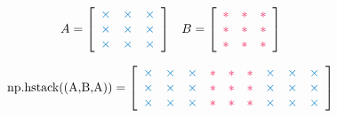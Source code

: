 \begin{align*}
A = \left[\begin{array}{ccc}
\textcolor{blue}{\times}&\textcolor{blue}{\times}&\textcolor{blue}{\times}\\
\textcolor{blue}{\times}&\textcolor{blue}{\times}&\textcolor{blue}{\times}\\
\textcolor{blue}{\times}&\textcolor{blue}{\times}&\textcolor{blue}{\times}
\end{array}\right]
&&
B = \left[\begin{array}{ccc}
\textcolor{red}{*} & \textcolor{red}{*} & \textcolor{red}{*} \\
\textcolor{red}{*} & \textcolor{red}{*} & \textcolor{red}{*} \\
\textcolor{red}{*} & \textcolor{red}{*} & \textcolor{red}{*}
\end{array}\right]
\end{align*}

\begin{align*}
\text{\li{np.hstack((A,B,A))}} =
\left[\begin{array}{ccccccccc}
\textcolor{blue}{\times}&\textcolor{blue}{\times}&\textcolor{blue}{\times}&
\textcolor{red}{*} & \textcolor{red}{*} & \textcolor{red}{*}&
\textcolor{blue}{\times}&\textcolor{blue}{\times}&\textcolor{blue}{\times}\\
\textcolor{blue}{\times}&\textcolor{blue}{\times}&\textcolor{blue}{\times}&
\textcolor{red}{*} & \textcolor{red}{*} & \textcolor{red}{*}&
\textcolor{blue}{\times}&\textcolor{blue}{\times}&\textcolor{blue}{\times}\\
\textcolor{blue}{\times}&\textcolor{blue}{\times}&\textcolor{blue}{\times}&
\textcolor{red}{*} & \textcolor{red}{*} & \textcolor{red}{*}&
\textcolor{blue}{\times}&\textcolor{blue}{\times}&\textcolor{blue}{\times}
\end{array}\right]
\end{align*}

